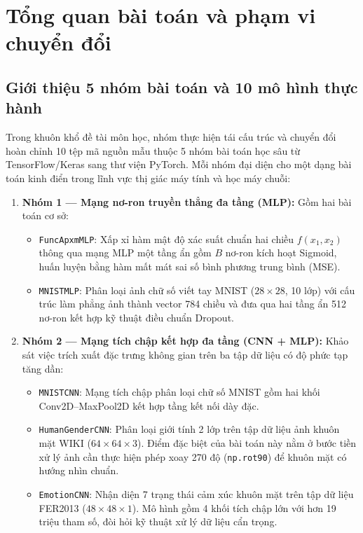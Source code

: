 \chapter{Tổng quan bài toán và phạm vi chuyển đổi}

\section{Giới thiệu 5 nhóm bài toán và 10 mô hình thực hành}
Trong khuôn khổ đề tài môn học, nhóm thực hiện tái cấu trúc và chuyển đổi hoàn chỉnh 10 tệp mã nguồn mẫu thuộc 5 nhóm bài toán học sâu từ TensorFlow/Keras sang thư viện PyTorch. Mỗi nhóm đại diện cho một dạng bài toán kinh điển trong lĩnh vực thị giác máy tính và học máy chuỗi:

\begin{enumerate}[label=\textbf{\arabic*.}]
\item \textbf{Nhóm 1 — Mạng nơ-ron truyền thẳng đa tầng (MLP):} Gồm hai bài toán cơ sở:
\begin{itemize}
\item \texttt{FuncApxmMLP}: Xấp xỉ hàm mật độ xác suất chuẩn hai chiều $f(x_1, x_2)$ thông qua mạng MLP một tầng ẩn gồm $B$ nơ-ron kích hoạt Sigmoid, huấn luyện bằng hàm mất mát sai số bình phương trung bình (MSE).
\item \texttt{MNISTMLP}: Phân loại ảnh chữ số viết tay MNIST ($28\times 28$, 10 lớp) với cấu trúc làm phẳng ảnh thành vector 784 chiều và đưa qua hai tầng ẩn 512 nơ-ron kết hợp kỹ thuật điều chuẩn Dropout.
\end{itemize}

\item \textbf{Nhóm 2 — Mạng tích chập kết hợp đa tầng (CNN + MLP):} Khảo sát việc trích xuất đặc trưng không gian trên ba tập dữ liệu có độ phức tạp tăng dần:
\begin{itemize}
\item \texttt{MNISTCNN}: Mạng tích chập phân loại chữ số MNIST gồm hai khối Conv2D--MaxPool2D kết hợp tầng kết nối dày đặc.
\item \texttt{HumanGenderCNN}: Phân loại giới tính 2 lớp trên tập dữ liệu ảnh khuôn mặt WIKI ($64\times 64\times 3$). Điểm đặc biệt của bài toán này nằm ở bước tiền xử lý ảnh cần thực hiện phép xoay 270 độ (\texttt{np.rot90}) để khuôn mặt có hướng nhìn chuẩn.
\item \texttt{EmotionCNN}: Nhận diện 7 trạng thái cảm xúc khuôn mặt trên tập dữ liệu FER2013 ($48\times 48\times 1$). Mô hình gồm 4 khối tích chập lớn với hơn 19 triệu tham số, đòi hỏi kỹ thuật xử lý dữ liệu cẩn trọng.
\end{itemize}


\end{enumerate}
